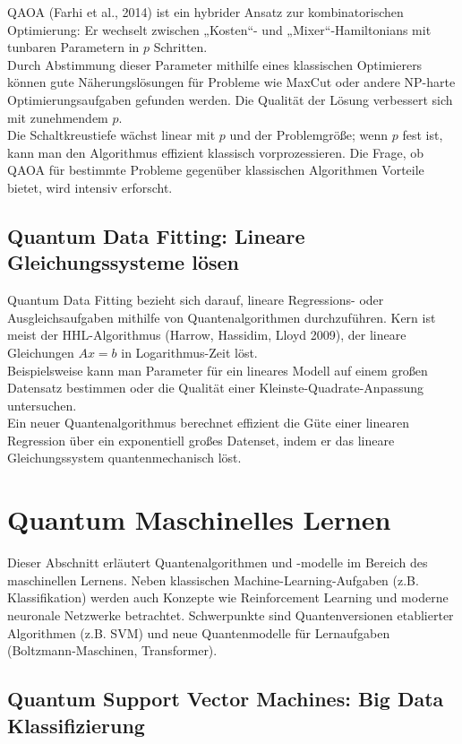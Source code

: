 QAOA (Farhi et al., 2014) ist ein hybrider Ansatz zur kombinatorischen Optimierung: Er wechselt zwischen „Kosten“- und „Mixer“-Hamiltonians mit tunbaren Parametern in $p$ Schritten.\\
Durch Abstimmung dieser Parameter mithilfe eines klassischen Optimierers können gute Näherungslösungen für Probleme wie MaxCut oder andere NP-harte Optimierungsaufgaben gefunden werden. Die Qualität der Lösung verbessert sich mit zunehmendem $p$.\\
Die Schaltkreustiefe wächst linear mit $p$ und der Problemgröße; wenn $p$ fest ist, kann man den Algorithmus effizient klassisch vorprozessieren. Die Frage, ob QAOA für bestimmte Probleme gegenüber klassischen Algorithmen Vorteile bietet, wird intensiv erforscht.\\

\subsection{Quantum Data Fitting: Lineare Gleichungssysteme lösen}

Quantum Data Fitting bezieht sich darauf, lineare Regressions- oder Ausgleichsaufgaben mithilfe von Quantenalgorithmen durchzuführen. Kern ist meist der HHL-Algorithmus (Harrow, Hassidim, Lloyd 2009), der lineare Gleichungen $Ax=b$ in Logarithmus-Zeit löst.\\
Beispielsweise kann man Parameter für ein lineares Modell auf einem großen Datensatz bestimmen oder die Qualität einer Kleinste-Quadrate-Anpassung untersuchen.\\
Ein neuer Quantenalgorithmus berechnet effizient die Güte einer linearen Regression über ein exponentiell großes Datenset, indem er das lineare Gleichungssystem quantenmechanisch löst.

\section{Quantum Maschinelles Lernen}
Dieser Abschnitt erläutert Quantenalgorithmen und -modelle im Bereich des maschinellen Lernens. Neben klassischen Machine-Learning-Aufgaben (z.B. Klassifikation) werden auch Konzepte wie Reinforcement Learning und moderne neuronale Netzwerke betrachtet. Schwerpunkte sind Quantenversionen etablierter Algorithmen (z.B. SVM) und neue Quantenmodelle für Lernaufgaben (Boltzmann-Maschinen, Transformer).

\subsection{Quantum Support Vector Machines: Big Data Klassifizierung}

